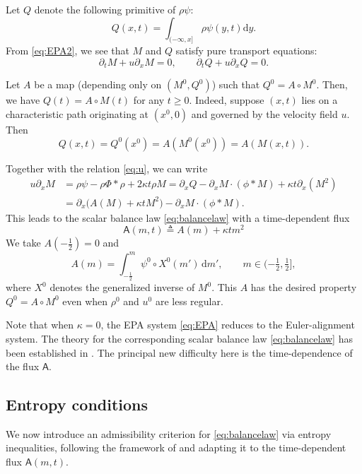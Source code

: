 \documentclass[11pt,reqno]{amsart}
\theoremstyle{definition}
\theoremstyle{remark}
\def\dd{\mathrm{d}}
\def\pa{\partial}
\def\A{\mathsf{A}}
\begin{document}
	Let $Q$ denote the following primitive of $\rho\psi$:
	\[
	Q(x,t) = \int_{(-\infty,x]} \rho \psi(y,t)\dd y.
	\]
	From \eqref{eq:EPA2}, we see that $M$ and $Q$ satisfy pure transport equations:
	\[
	\pa_t M + u\pa_x M  =  0, \qquad
	\pa_t Q + u\pa_x Q  =  0.
	\]
	
	Let $A$ be a map (depending only on $(M^0, Q^0)$) such that $Q^0 = A\circ M^0$. 
	Then, we have $Q(t) = A\circ M(t)$ for any $t\geq0$. Indeed, suppose $(x,t)$ lies on a characteristic path originating at $(x^0,0)$ and governed by the velocity field $u$. Then
	\[
	Q(x,t) = Q^0(x^0)=A(M^0(x^0))=A(M(x,t)).
	\]
	
	Together with the relation \eqref{eq:u}, we can write
	\begin{align*}
		u\pa_x M  & = \rho \psi - \rho \Phi*\rho +2\kappa t\rho M = \pa_x Q - \pa_x M\cdot (\phi\ast M) + \kappa t \pa_x(M^2)\\
		& = \pa_x \big(A(M)+\kappa tM^2\big) - \pa_x M \cdot (\phi\ast M).
	\end{align*}
	This leads to the scalar balance law \eqref{eq:balancelaw} with a time-dependent flux
	\begin{equation}\label{def:At}
		\A(m,t) \triangleq A(m) +\kappa t m^2 %
	\end{equation} 
	We take $A(-\frac12) = 0$ and
	\begin{equation}
		\label{def:Agen}
		A(m) = \int_{-\frac12}^m \psi^0\circ X^0(m')\,\dd m',
		\qquad m\in (-\tfrac12, \tfrac12],
	\end{equation}
	where $X^0$ denotes the generalized inverse of $M^0$.  This $A$ has the desired property $Q^0 = A\circ M^0$ even when $\rho^0$ and $u^0$ are less regular.
	
	Note that when $\kappa=0$, the EPA system \eqref{eq:EPA} reduces to the Euler-alignment system. The theory for the corresponding scalar balance law \eqref{eq:balancelaw} has been established in \cite{leslie2023sticky}. The principal new difficulty here is the time-dependence of the flux $\A$.
	
	
	\subsection{Entropy conditions}
	We now introduce an admissibility criterion for \eqref{eq:balancelaw} via entropy inequalities, following the framework of \cite{leslie2023sticky} and adapting it to the time-dependent flux $\A(m,t)$.
	
\end{document}
